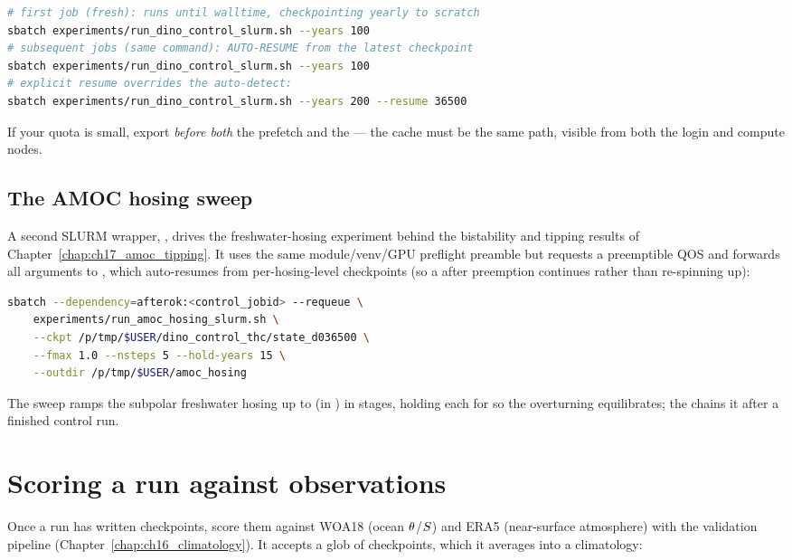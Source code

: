 \begin{lstlisting}[language=bash]
# first job (fresh): runs until walltime, checkpointing yearly to scratch
sbatch experiments/run_dino_control_slurm.sh --years 100
# subsequent jobs (same command): AUTO-RESUME from the latest checkpoint
sbatch experiments/run_dino_control_slurm.sh --years 100
# explicit resume overrides the auto-detect:
sbatch experiments/run_dino_control_slurm.sh --years 200 --resume 36500
\end{lstlisting}

\noindent If your  quota is small, export
 \emph{before both} the prefetch
and the  --- the cache must be the same path, visible from both the
login and compute nodes.

\subsection{The AMOC hosing sweep}

A second SLURM wrapper,
,
drives the freshwater-hosing experiment behind the bistability and tipping
results of Chapter~\ref{chap:ch17_amoc_tipping}. It uses the same module/venv/GPU
preflight preamble but requests a preemptible QOS and forwards all arguments to
, which auto-resumes from per-hosing-level
checkpoints (so a  after preemption continues rather than
re-spinning up):

\begin{lstlisting}[language=bash]
sbatch --dependency=afterok:<control_jobid> --requeue \
    experiments/run_amoc_hosing_slurm.sh \
    --ckpt /p/tmp/$USER/dino_control_thc/state_d036500 \
    --fmax 1.0 --nsteps 5 --hold-years 15 \
    --outdir /p/tmp/$USER/amoc_hosing
\end{lstlisting}

\noindent The sweep ramps the subpolar freshwater hosing up to 
(in \Sv) in \code{--nsteps} stages, holding each for  so the
overturning equilibrates; the  chains it after a
finished control run.

\section{Scoring a run against observations}

Once a run has written checkpoints, score them against WOA18 (ocean
$\theta$/$S$) and ERA5 (near-surface atmosphere) with the validation
pipeline (Chapter~\ref{chap:ch16_climatology}). It accepts a glob of checkpoints,
which it averages into a climatology:

